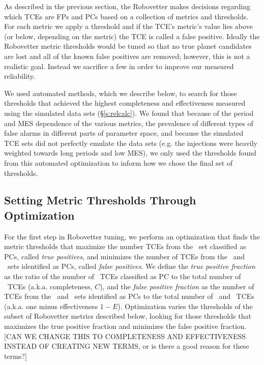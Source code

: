 \label{s:optimize}
As described in the previous section, the Robovetter makes decisions regarding which TCEs are FPs and PCs based on a collection of metrics and thresholds.  For each metric we apply a threshold and if the TCE's metric's value lies above (or below, depending on the metric) the TCE is called a false positive.  Ideally the Robovetter metric thresholds would be tuned so that no true planet candidates are lost and all of the known false positives are removed; however, this is not a realistic goal.  Instead we sacrifice a few  in order to improve our measured reliability. 

We used automated methods, which we describe below, to search for those thresholds that achieved the highest completeness and effectiveness measured using the simulated data sets (\S\ref{s:relcalc}). We found that because of the period and MES dependence of the various metrics, the prevalence of different types of false alarms in different parts of parameter space, and because the simulated TCE sets did not perfectly emulate the data sets (e.g. the injections were heavily weighted towards long periods and low MES), we only used the thresholds found from this automated optimization to inform how we chose the final set of thresholds.



\subsection{Setting Metric Thresholds Through Optimization}
\label{s:full_optimize}
For the first step in Robovetter tuning, we perform an optimization that finds the metric thresholds that maximize the number TCEs from the \injtce\ set classified as PCs, called {\it true positives}, and minimizes the number of TCEs from the \scrtce\ and \invtce\ sets identified as PCs, called {\it false positives}.  We define the {\it true positive fraction} as the ratio of the number of \injtce\ TCEs classified as PC to the total number of \injtce\ TCEs (a.k.a. completeness, $C$), and the {\it false positive fraction} as the number of TCEs from the \scrtce\ and \invtce\ sets identified as PCs to the total number of \scrtce\ and \invtce\ TCEs (a.k.a. one minus effectiveness $1-E$).  Optimization varies the thresholds of the subset of Robovetter metrics described below, looking for those thresholds that maximizes the true positive fraction and minimizes the false positive fraction.  [CAN WE CHANGE THIS TO COMPLETENESS AND EFFECTIVENESS INSTEAD OF CREATING NEW TERMS, or is there a good reason for these terms?]


